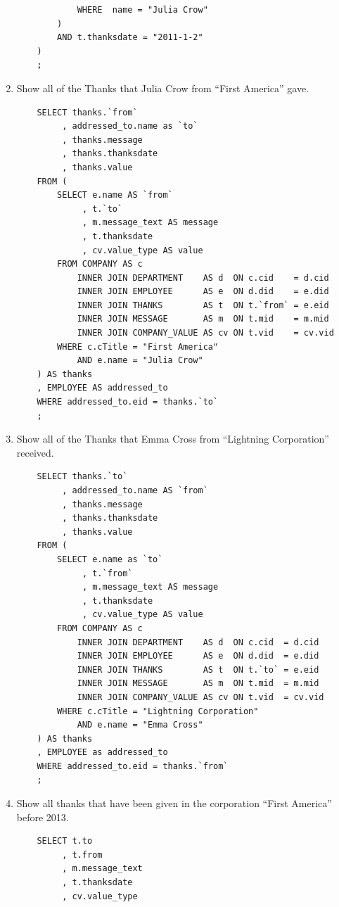 \documentclass[11pt]{report}
\begin{document}
\begin{enumerate}
\begin{verbatim}
            WHERE  name = "Julia Crow"
        )
        AND t.thanksdate = "2011-1-2"
    )
    ;
    \end{verbatim}
    \item Show all of the Thanks that Julia Crow from ``First America'' gave.
    \begin{verbatim}
    SELECT thanks.`from`
         , addressed_to.name as `to`
         , thanks.message
         , thanks.thanksdate
         , thanks.value
    FROM (
        SELECT e.name AS `from`
             , t.`to`
             , m.message_text AS message
             , t.thanksdate
             , cv.value_type AS value
        FROM COMPANY AS c
            INNER JOIN DEPARTMENT    AS d  ON c.cid    = d.cid
            INNER JOIN EMPLOYEE      AS e  ON d.did    = e.did
            INNER JOIN THANKS        AS t  ON t.`from` = e.eid
            INNER JOIN MESSAGE       AS m  ON t.mid    = m.mid
            INNER JOIN COMPANY_VALUE AS cv ON t.vid    = cv.vid
        WHERE c.cTitle = "First America"
            AND e.name = "Julia Crow"
    ) AS thanks
    , EMPLOYEE AS addressed_to
    WHERE addressed_to.eid = thanks.`to`
    ;
    \end{verbatim}
    \item Show all of the Thanks that Emma Cross from ``Lightning Corporation'' received.
    \begin{verbatim}
    SELECT thanks.`to`
         , addressed_to.name AS `from`
         , thanks.message
         , thanks.thanksdate
         , thanks.value
    FROM (
        SELECT e.name as `to`
             , t.`from`
             , m.message_text AS message
             , t.thanksdate
             , cv.value_type AS value
        FROM COMPANY AS c
            INNER JOIN DEPARTMENT    AS d  ON c.cid  = d.cid
            INNER JOIN EMPLOYEE      AS e  ON d.did  = e.did
            INNER JOIN THANKS        AS t  ON t.`to` = e.eid
            INNER JOIN MESSAGE       AS m  ON t.mid  = m.mid
            INNER JOIN COMPANY_VALUE AS cv ON t.vid  = cv.vid
        WHERE c.cTitle = "Lightning Corporation"
            AND e.name = "Emma Cross"
    ) AS thanks
    , EMPLOYEE as addressed_to
    WHERE addressed_to.eid = thanks.`from`
    ;
    \end{verbatim}
    \item Show all thanks that have been given in the corporation ``First America'' before 2013.
    \begin{verbatim}
    SELECT t.to
         , t.from
         , m.message_text
         , t.thanksdate
         , cv.value_type

\end{verbatim}
\end{enumerate}
\end{document}
